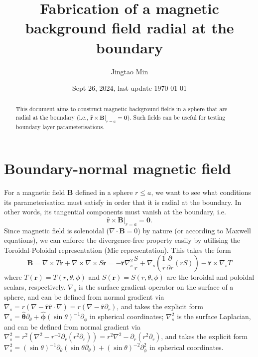 \documentclass[a4paper, 11pt]{article}
\title{Fabrication of a magnetic background field radial at the boundary}
\author{Jingtao Min}
\date{Sept 26, 2024, last update \today}
\begin{document}
\maketitle

\begin{abstract}
    \noindent This document aims to construct magnetic background fields in a sphere that are radial at the boundary (i.e., $\hat{\mathbf{r}}\times \mathbf{B}|_{r = a} = \mathbf{0}$). Such fields can be useful for testing boundary layer parameterisations.
\end{abstract}

\section{Boundary-normal magnetic field}

For a magnetic field $\mathbf{B}$ defined in a sphere $r \leq a$, we want to see what conditions its parameterisation must satisfy in order that it is radial at the boundary. In other words, its tangential components must vanish at the boundary, i.e. 
\begin{equation}
    \hat{\mathbf{r}}\times \mathbf{B}|_{r=a} = \mathbf{0}.
\end{equation}
Since magnetic field is solenoidal ($\nabla\cdot \mathbf{B} = 0$) by nature (or according to Maxwell equations), we can enforce the divergence-free property easily by utilising the Toroidal-Poloidal representation (Mie representation). This takes the form
\begin{equation}
    \mathbf{B} = \nabla\times T \mathbf{r} + \nabla\times \nabla\times S \mathbf{r} = - \hat{\mathbf{r}} \nabla_s^2 \frac{S}{r} + \nabla_s \left(\frac{1}{r}\frac{\partial}{\partial r}(rS)\right) - \hat{\mathbf{r}}\times \nabla_s T
\end{equation}
where $T(\mathbf{r}) = T(r,\theta,\phi)$ and $S(\mathbf{r}) = S(r,\theta,\phi)$ are the toroidal and poloidal scalars, respectively. $\nabla_s$ is the surface gradient operator on the surface of a sphere, and can be defined from normal gradient via $\nabla_s = r (\nabla - \hat{\mathbf{r}} \hat{\mathbf{r}}\cdot \nabla) = r (\nabla - \hat{\mathbf{r}} \partial_r)$, and takes the explicit form $\nabla_s = \hat{\bm{\theta}} \partial_\theta + \hat{\bm{\phi}} (\sin\theta)^{-1} \partial_\phi$ in spherical coordinates; 
$\nabla_s^2$ is the surface Laplacian, and can be defined from normal gradient via $\nabla_s^2 = r^2 (\nabla^2 - r^{-2}\partial_r (r^2 \partial_r)) = r^2 \nabla^2 - \partial_r (r^2 \partial_r)$, and takes the explicit form $\nabla_s^2 = (\sin\theta)^{-1}\partial_\theta (\sin\theta \partial_\theta) + (\sin\theta)^{-2} \partial_\phi^2$ in spherical coordinates.
\end{document}
